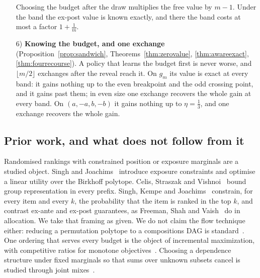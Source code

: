 \begin{enumerate}
Choosing the budget after the draw multiplies the free value by $m-1$. Under the band the
ex-post value is known exactly, and there the band costs at most a factor $1+\frac1m$.
\item[6)] \textbf{Knowing the budget, and one exchange} (Proposition~\ref{prop:sandwich},
Theorems~\ref{thm:zerovalue}, \ref{thm:awareexact}, \ref{thm:fourrecourse}). A policy that learns
the budget first is never worse, and $\lfloor m/2\rfloor$ exchanges after the reveal reach it. On
$g_m$ its value is exact at every band: it gains nothing up to the even breakpoint and the odd
crossing point, and it gains past them; in even size one exchange recovers the whole gain at
every band. On $(a,-a,b,-b)$ it gains nothing up to $\eta=\frac13$, and one exchange recovers the
whole gain.
\end{enumerate}

\subsection{Prior work, and what does not follow from it}

Randomised rankings with constrained position or exposure marginals are a studied object.
Singh and Joachims~\cite{singh2018} introduce exposure constraints and optimise a linear
utility over the Birkhoff polytope. Celis, Straszak and Vishnoi~\cite{celis2018} bound group
representation in every prefix. Singh, Kempe and Joachims~\cite{singh2021} constrain, for every
item and every $k$, the probability that the item is ranked in the top $k$, and contrast ex-ante
and ex-post guarantees, as Freeman, Shah and Vaish~\cite{freeman2020} do in allocation. We
take that framing as given. We do not claim the flow technique either: reducing a permutation
polytope to a compositions DAG is standard~\cite{schrijver2003}. One ordering that serves every
budget is the object of incremental maximization, with competitive ratios for monotone
objectives~\cite{disser2023,bienkowski2026}. Choosing a dependence structure under fixed
marginals so that sums over unknown subsets cancel is studied through joint
mixes~\cite{koike2022}.

